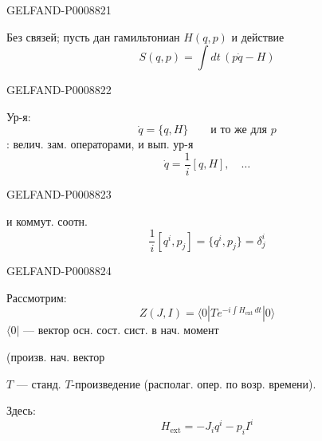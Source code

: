\begin{GelfandAdjacentEvidence}{GELFAND-P000882}{1}

Без связей; пусть дан гамильтониан $H(q,p)$ и действие
\begin{equation*}
S(q,p)=\int dt\,(p\dot q-H)
\tag{22}
\end{equation*}
\end{GelfandAdjacentEvidence}
\begin{GelfandAdjacentEvidence}{GELFAND-P000882}{2}


Ур-я:
\begin{equation*}
\dot q=\{q,H\}\qquad\text{и то же для }p
\tag{23}
\end{equation*}
: велич. зам. операторами, и вып. ур-я
\begin{equation*}
\dot q=\frac1i[q,H],\quad\ldots
\tag{24}
\end{equation*}
\end{GelfandAdjacentEvidence}
\begin{GelfandAdjacentEvidence}{GELFAND-P000882}{3}


и коммут. соотн.
\begin{equation*}
\frac1i[q^i,p_j]=\{q^i,p_j\}=\delta^i_j
\tag{25}
\end{equation*}
\end{GelfandAdjacentEvidence}
\begin{GelfandAdjacentEvidence}{GELFAND-P000882}{4}


Рассмотрим:
\begin{equation*}
Z(J,I)=\langle0|T e^{-i\int H_{\mathrm{ext}}\,dt}|0\rangle
\tag{26}
\end{equation*}
$\langle0|$ --- вектор осн. сост. сист. в нач. момент

\hspace{3em}(произв. нач. вектор

$T$ --- станд. $T$-произведение (располаг. опер. по возр. времени).

Здесь:
\begin{equation*}
H_{\mathrm{ext}}=-J_iq^i-p_iI^i
\tag{27}
\end{equation*}
\end{GelfandAdjacentEvidence}
